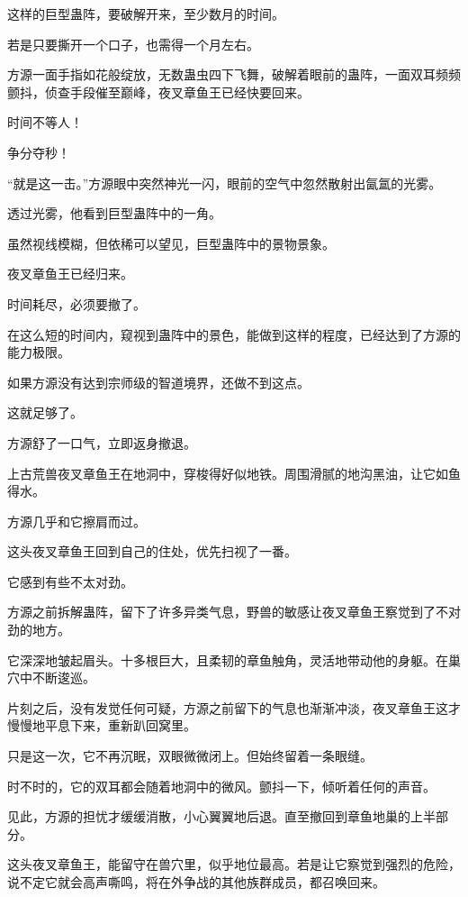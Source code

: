 
\begin{this_body}

这样的巨型蛊阵，要破解开来，至少数月的时间。

若是只要撕开一个口子，也需得一个月左右。

方源一面手指如花般绽放，无数蛊虫四下飞舞，破解着眼前的蛊阵，一面双耳频频颤抖，侦查手段催至巅峰，夜叉章鱼王已经快要回来。

时间不等人！

争分夺秒！

“就是这一击。”方源眼中突然神光一闪，眼前的空气中忽然散射出氤氲的光雾。

透过光雾，他看到巨型蛊阵中的一角。

虽然视线模糊，但依稀可以望见，巨型蛊阵中的景物景象。

夜叉章鱼王已经归来。

时间耗尽，必须要撤了。

在这么短的时间内，窥视到蛊阵中的景色，能做到这样的程度，已经达到了方源的能力极限。

如果方源没有达到宗师级的智道境界，还做不到这点。

这就足够了。

方源舒了一口气，立即返身撤退。

上古荒兽夜叉章鱼王在地洞中，穿梭得好似地铁。周围滑腻的地沟黑油，让它如鱼得水。

方源几乎和它擦肩而过。

这头夜叉章鱼王回到自己的住处，优先扫视了一番。

它感到有些不太对劲。

方源之前拆解蛊阵，留下了许多异类气息，野兽的敏感让夜叉章鱼王察觉到了不对劲的地方。

它深深地皱起眉头。十多根巨大，且柔韧的章鱼触角，灵活地带动他的身躯。在巢穴中不断逡巡。

片刻之后，没有发觉任何可疑，方源之前留下的气息也渐渐冲淡，夜叉章鱼王这才慢慢地平息下来，重新趴回窝里。

只是这一次，它不再沉眠，双眼微微闭上。但始终留着一条眼缝。

时不时的，它的双耳都会随着地洞中的微风。颤抖一下，倾听着任何的声音。

见此，方源的担忧才缓缓消散，小心翼翼地后退。直至撤回到章鱼地巢的上半部分。

这头夜叉章鱼王，能留守在兽穴里，似乎地位最高。若是让它察觉到强烈的危险，说不定它就会高声嘶鸣，将在外争战的其他族群成员，都召唤回来。


\end{this_body}
